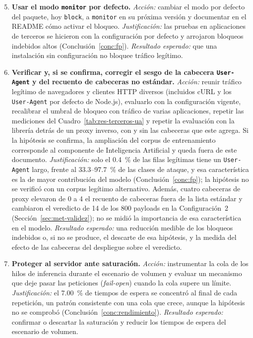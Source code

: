 \begin{enumerate}
    \setcounter{enumi}{4}
    \item \textbf{Usar el modo \texttt{monitor} por defecto.} \textit{Acción:} cambiar el modo por defecto del paquete, hoy \texttt{block}, a \texttt{monitor} en su próxima versión y documentar en el README cómo
    activar el bloqueo. \textit{Justificación:} las pruebas en aplicaciones de terceros se hicieron
    con la configuración por defecto y arrojaron bloqueos indebidos altos
    (Conclusión~\ref{conc:fp}). \textit{Resultado esperado:} que una instalación sin configuración
    no bloquee tráfico legítimo.

        \item \textbf{Verificar y, si se confirma, corregir el sesgo de la cabecera
    \texttt{User-Agent} y del recuento de cabeceras no estándar.} \textit{Acción:} reunir tráfico
    legítimo de navegadores y clientes HTTP diversos (incluidos cURL y los \texttt{User-Agent} por
    defecto de Node.js), evaluarlo con la configuración vigente, recalibrar el umbral de bloqueo con
    tráfico de varias aplicaciones, repetir las mediciones del Cuadro~\ref{tab:res-terceros-ua} y
    repetir la evaluación con la librería detrás de un proxy inverso, con y sin las cabeceras que este
    agrega. Si la hipótesis se confirma, la
    ampliación del corpus de entrenamiento corresponde al componente de Inteligencia Artificial y
    queda fuera de este documento. \textit{Justificación:} solo el 0.4~\% de las filas legítimas
    tiene un \texttt{User-Agent} largo, frente al 33.3--97.7~\% de las clases de ataque, y esa
    característica es la de mayor contribución del modelo (Conclusión~\ref{conc:fp}); la hipótesis
    no se verificó con un corpus legítimo alternativo. Además, cuatro cabeceras de proxy elevaron de
    0 a 4 el recuento de cabeceras fuera de la lista estándar y cambiaron el veredicto de 14 de los
    800 payloads en la Configuración~2 (Sección~\ref{sec:met-validez}); no se midió la importancia de
    esa característica en el modelo. \textit{Resultado esperado:} una reducción medible de los
    bloqueos indebidos o, si no se produce, el descarte de esa hipótesis, y la medida del efecto de
    las cabeceras del despliegue sobre el veredicto.

    \item \label{rec:cola}\textbf{Proteger al servidor ante saturación.} \textit{Acción:}
    instrumentar la cola de los hilos de inferencia durante el escenario de volumen y evaluar un
    mecanismo que deje pasar las peticiones (\textit{fail-open}) cuando la cola supere un límite.
    \textit{Justificación:} el 7.00~\% de tiempos de espera se concentró al final de cada
    repetición, un patrón consistente con una cola que crece, aunque la hipótesis no se comprobó
    (Conclusión~\ref{conc:rendimiento}). \textit{Resultado esperado:} confirmar o descartar la
    saturación y reducir los tiempos de espera del escenario de volumen.


\end{enumerate}
